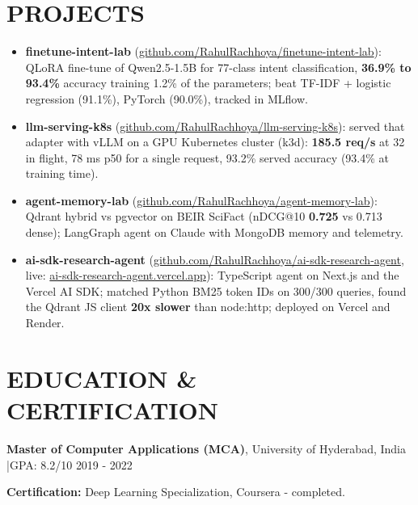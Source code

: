 \documentclass[10pt,a4paper]{article}
\begin{document}
\section*{PROJECTS}
{\raggedright
\begin{itemize}
\item \textbf{finetune-intent-lab} (\href{https://github.com/RahulRachhoya/finetune-intent-lab}{\color{accent}github.com/RahulRachhoya/finetune-intent-lab}): QLoRA fine-tune of Qwen2.5-1.5B for 77-class intent classification, \textbf{36.9\% to 93.4\%} accuracy training 1.2\% of the parameters; beat TF-IDF + logistic regression (91.1\%), PyTorch (90.0\%), tracked in MLflow.
\item \textbf{llm-serving-k8s} (\href{https://github.com/RahulRachhoya/llm-serving-k8s}{\color{accent}github.com/RahulRachhoya/llm-serving-k8s}): served that adapter with vLLM on a GPU Kubernetes cluster (k3d): \textbf{185.5 req/s} at 32 in flight, 78 ms p50 for a single request, 93.2\% served accuracy (93.4\% at training time).
\item \textbf{agent-memory-lab} (\href{https://github.com/RahulRachhoya/agent-memory-lab}{\color{accent}github.com/RahulRachhoya/agent-memory-lab}): Qdrant hybrid vs pgvector on BEIR \mbox{SciFact} (nDCG@10 \textbf{0.725} vs 0.713 dense); LangGraph agent on Claude with MongoDB memory and telemetry.
\item \textbf{ai-sdk-research-agent} (\href{https://github.com/RahulRachhoya/ai-sdk-research-agent}{\color{accent}github.com/RahulRachhoya/ai-sdk-research-agent}, live: \href{https://ai-sdk-research-agent.vercel.app}{\color{accent}ai-sdk-research-agent.vercel.app}): TypeScript agent on Next.js and the Vercel AI SDK; matched Python BM25 token IDs on 300/300 queries, found the Qdrant JS client \textbf{20x slower} than node:http; deployed on Vercel and Render.
\end{itemize}}
\section*{EDUCATION \& CERTIFICATION}
\textbf{Master of Computer Applications (MCA)}, University of Hyderabad, India \enspace|\enspace GPA: 8.2/10 \hfill {\small 2019 - 2022}\par
\textbf{Certification:} Deep Learning Specialization, Coursera - completed.
\end{document}

